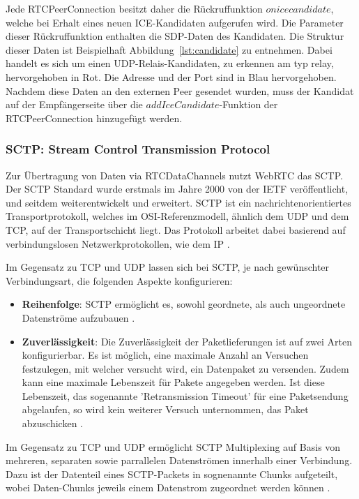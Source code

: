 Jede RTCPeerConnection besitzt daher die Rückruffunktion \glqq{}$onicecandidate$\grqq{}, welche bei Erhalt eines neuen \acs{ICE}-Kandidaten aufgerufen wird. Die Parameter dieser Rückruffunktion enthalten die \acs{SDP}-Daten des Kandidaten. Die Struktur dieser Daten ist Beispielhaft Abbildung~\ref{lst:candidate} zu entnehmen. Dabei handelt es sich um einen \acs{UDP}-Relais-Kandidaten, zu erkennen am \glqq{}typ relay\grqq{}, hervorgehoben in Rot. Die Adresse und der Port sind in Blau hervorgehoben. Nachdem diese Daten an den externen Peer gesendet wurden, muss der Kandidat auf der Empfängerseite über die $addIceCandidate$-Funktion der RTCPeerConnection hinzugefügt werden.

\subsubsection{SCTP: Stream Control Transmission Protocol}
Zur Übertragung von Daten via RTCDataChannels nutzt \acs{WebRTC} das \acf{SCTP}. Der \acs{SCTP} Standard wurde erstmals im Jahre 2000 von der \acs{IETF} veröffentlicht, und seitdem weiterentwickelt und erweitert. \acs{SCTP} ist ein nachrichtenorientiertes Transportprotokoll, welches im \acf{OSI}-Referenzmodell, ähnlich dem \acf{UDP} und dem \acf{TCP}, auf der Transportschicht liegt. Das Protokoll arbeitet dabei basierend auf verbindungslosen Netzwerkprotokollen, wie dem \acf{IP} \cite{sctpRFC}.\par

Im Gegensatz zu \acs{TCP} und \acs{UDP} lassen sich bei \acs{SCTP}, je nach gewünschter Verbindungsart, die folgenden Aspekte konfigurieren:
\begin{itemize}
	\item\textbf{Reihenfolge}: \acs{SCTP} ermöglicht es, sowohl geordnete, als auch ungeordnete Datenströme aufzubauen \cite{sctpRFC}.
	\item\textbf{Zuverlässigkeit}: Die Zuverlässigkeit der Paketlieferungen ist auf zwei Arten konfigurierbar. Es ist möglich, eine maximale Anzahl an Versuchen festzulegen, mit welcher versucht wird, ein Datenpaket zu versenden. Zudem kann eine maximale Lebenszeit für Pakete angegeben werden. Ist diese Lebenszeit, das sogenannte 'Retransmission Timeout' für eine Paketsendung abgelaufen, so wird kein weiterer Versuch unternommen, das Paket abzuschicken \cite{sctpRFC}.
\end{itemize}

\vspace{11pt}

Im Gegensatz zu \acs{TCP} und \acs{UDP} ermöglicht \acs{SCTP} Multiplexing auf Basis von mehreren, separaten sowie parrallelen Datenströmen innerhalb einer Verbindung. Dazu ist der Datenteil eines \acs{SCTP}-Packets in sognenannte \glqq{}Chunks\grqq{}  aufgeteilt, wobei Daten-Chunks jeweils einem Datenstrom zugeordnet werden können \cite{sctpRFC}.\par

